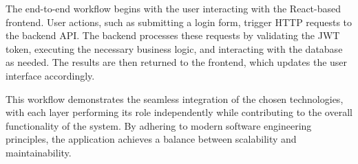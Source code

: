 \par The end-to-end workflow begins with the user interacting with the React-based frontend. User actions, such as submitting a login form, trigger HTTP requests to the backend API. The backend processes these requests by validating the JWT token, executing the necessary business logic, and interacting with the database as needed. The results are then returned to the frontend, which updates the user interface accordingly.

\par This workflow demonstrates the seamless integration of the chosen technologies, with each layer performing its role independently while contributing to the overall functionality of the system. By adhering to modern software engineering principles, the application achieves a balance between scalability and maintainability.



